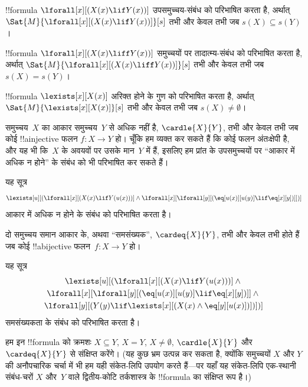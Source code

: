 \documentclass[../../../include/open-logic-section]{subfiles}
\begin{document}


\begin{prop}
!!{formula} $\lforall[x][(X(x) \lif Y(x))]$ उपसमुच्चय-संबंध को परिभाषित
करता है, अर्थात् $\Sat{M}{\lforall[x][(X(x) \lif Y(x))]}[s]$ तभी और केवल
तभी जब $s(X) \subseteq s(Y)$।
\end{prop}

\begin{prop}
!!{formula} $\lforall[x][(X(x) \liff Y(x))]$ समुच्चयों पर तादात्म्य-संबंध
को परिभाषित करता है, अर्थात्
$\Sat{M}{\lforall[x][(X(x) \liff Y(x))]}[s]$ तभी और केवल तभी जब $s(X) =
s(Y)$।
\end{prop}

\begin{prop}
!!{formula} $\lexists[x][X(x)]$ अरिक्त होने के गुण को परिभाषित करता है,
अर्थात् $\Sat{M}{\lexists[x][X(x)]}[s]$ तभी और केवल तभी जब $s(X) \neq
\emptyset$।
\end{prop}

समुच्चय~$X$ का आकार समुच्चय~$Y$ से अधिक नहीं है, $\cardle{X}{Y}$, तभी और
केवल तभी जब कोई !!a{injective} फलन $f\colon X \to Y$ हो। चूँकि हम व्यक्त
कर सकते हैं कि कोई फलन अंतःक्षेपी है, और यह भी कि~$X$ के अवयवों पर उसके
मान~$Y$ में हैं, इसलिए हम प्रांत के उपसमुच्चयों पर ``आकार में अधिक न होने''
के संबंध को भी परिभाषित कर सकते हैं।

\begin{prop}
यह सूत्र
\[
\lexists[u][(\lforall[x][(X(x) \lif Y(u(x)))] \land \lforall[x][\lforall[y][(\eq[u(x)][u(y)] \lif
      \eq[x][y])]])]
\]
आकार में अधिक न होने के संबंध को परिभाषित करता है।
\end{prop}

दो समुच्चय समान आकार के, अथवा ``समसंख्यक'', $\cardeq{X}{Y}$, तभी और केवल
तभी होते हैं जब कोई !!a{bijective} फलन~$f\colon X \to Y$ हो।

\begin{prop}
यह सूत्र
\begin{multline*}
  \lexists[u][(\lforall[x][(X(x) \lif Y(u(x)))] \land {}\\
    \lforall[x][\lforall[y][(\eq[u(x)][u(y)] \lif \eq[x][y])]]
  \land {} \\\lforall[y][(Y(y) \lif \lexists[x][(X(x)
      \land \eq[y][u(x)])])])]
\end{multline*}
समसंख्यकता के संबंध को परिभाषित करता है।
\end{prop}

हम इन !!{formula} को क्रमशः $X \subseteq Y$, $X = Y$, $X \neq
\emptyset$, $\cardle{X}{Y}$ और $\cardeq{X}{Y}$ से संक्षिप्त करेंगे। (यह
कुछ भ्रम उत्पन्न कर सकता है, क्योंकि समुच्चयों $X$ और $Y$ की अनौपचारिक
चर्चा में भी हम यही संकेत-लिपि उपयोग करते हैं---पर यहाँ यह संकेत-लिपि
एक-स्थानी संबंध-चरों $X$ और~$Y$ वाले द्वितीय-कोटि तर्कशास्त्र के !!{formula}
का संक्षिप्त रूप है।)
\end{document}
